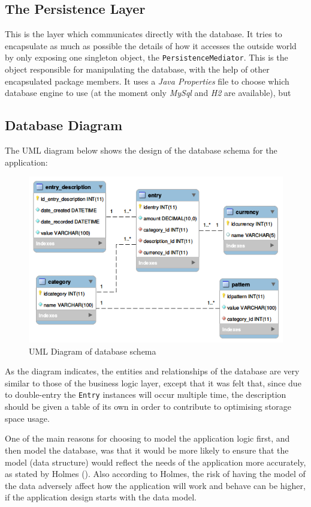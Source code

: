 \subsection{The Persistence Layer} \label{sec:AnalysisAndDesign.PersistenceLayer}
This is the layer which communicates directly with the database. It tries to
encapsulate as much as possible the details of how it accesses the outside
world by only exposing one singleton object, the \texttt{PersistenceMediator}.
This is the object responsible for manipulating the database, with the help of
other encapsulated package members. It uses a \emph{Java Properties} file to
choose which database engine to use (at the moment only \emph{MySql} and
\emph{H2} are available), but 

\subsection{Database Diagram} \label{sec:AnalysisAndDesign.PersistenceLayer}
The UML diagram below shows the design of the database schema for the
application:
\begin{figure}[ht!]
  \begin{center}
    \includegraphics[width=14cm]{./contents/img/Database_Diagram.png}
  \end{center}
  \caption{UML Diagram of database schema}
  \label{fig:ClassDiagram.AllClasses}
\end{figure}
\FloatBarrier

As the diagram indicates, the entities and relationships of the database are
very similar to those of the business logic layer, except that it was felt
that, since due to double-entry the \texttt{Entry} instances will occur
multiple time, the description should be given a table of its own in order to
contribute to optimising storage space usage.

One of the main reasons for choosing to model the application logic first, and
then model the database, was that it would be more likely to ensure that the
model (data structure) would reflect the needs of the application more
accurately, as stated by Holmes (\citeyear[][p.~141]{holmes2018mean}). Also
according to Holmes, the risk of having the model of the data adversely affect
how the application will work and behave can be higher, if the application
design starts with the data model.
